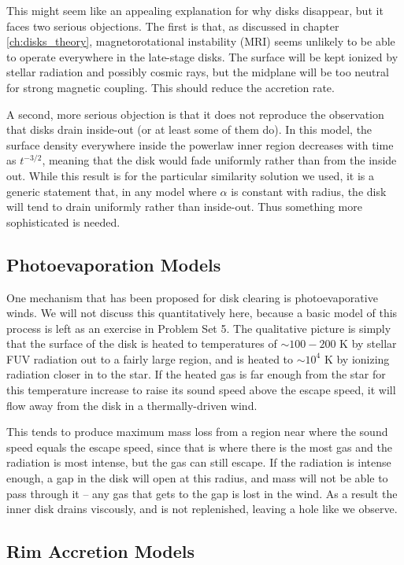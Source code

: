This might seem like an appealing explanation for why disks disappear, but it faces two serious objections. The first is that, as discussed in chapter \ref{ch:disks_theory}, magnetorotational instability (MRI) seems unlikely to be able to operate everywhere in the late-stage disks. The surface will be kept ionized by stellar radiation and possibly cosmic rays, but the midplane will be too neutral for strong magnetic coupling. This should reduce the accretion rate.

A second, more serious objection is that it does not reproduce the observation that disks drain inside-out (or at least some of them do). In this model, the surface density everywhere inside the powerlaw inner region decreases with time as $t^{-3/2}$, meaning that the disk would fade uniformly rather than from the inside out. While this result is for the particular similarity solution we used, it is a generic statement that, in any model where $\alpha$ is constant with radius, the disk will tend to drain uniformly rather than inside-out. Thus something more sophisticated is needed.


\subsection{Photoevaporation Models}

One mechanism that has been proposed for disk clearing is photoevaporative winds. We will not discuss this quantitatively here, because a basic model of this process is left as an exercise in Problem Set 5. The qualitative picture is simply that the surface of the disk is heated to temperatures of $\sim 100-200$ K by stellar FUV radiation out to a fairly large region, and is heated to $\sim 10^4$ K by ionizing radiation closer in to the star. If the heated gas is far enough from the star for this temperature increase to raise its sound speed above the escape speed, it will flow away from the disk in a thermally-driven wind.

This tends to produce maximum mass loss from a region near where the sound speed equals the escape speed, since that is where there is the most gas and the radiation is most intense, but the gas can still escape. If the radiation is intense enough, a gap in the disk will open at this radius, and mass will not be able to pass through it -- any gas that gets to the gap is lost in the wind. As a result the inner disk drains viscously, and is not replenished, leaving a hole like we observe.

\subsection{Rim Accretion Models}

